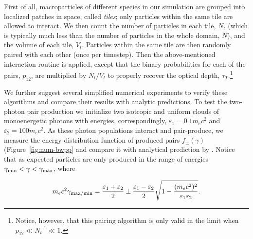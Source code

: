 First of all, macroparticles of different species in our simulation are grouped into localized patches in space, called \emph{tiles}; only particles within the same tile are allowed to interact. We then count the number of particles in each tile, $N_t$ (which is typically much less than the number of particles in the whole domain, $N$), and the volume of each tile, $V_t$. Particles within the same tile are then randomly paired with each other (once per timestep). Then the above-mentioned interaction routine is applied, except that the binary probabilities for each of the pairs, $p_{12}$, are multiplied by $N_t / V_t$ to properly recover the optical depth, $\tau_T$.\footnote{Notice, however, that this pairing algorithm is only valid in the limit when $p_{12}\ll N_t^{-1}\ll 1$.}

We further suggest several simplified numerical experiments to verify these algorithms and compare their results with analytic predictions. To test the two-photon pair production we initialize two isotropic and uniform clouds of monoenergetic photons with energies, correspondingly, $\varepsilon_1 = 0.1m_e c^2$ and $\varepsilon_2 = 100 m_e c^2$. As these photon populations interact and pair-produce, we measure the energy distribution function of produced pairs $f_{\pm}(\gamma)$ (Figure~\ref{fig:num-bwpp} and compare it with analytical prediction by \cite{1983Ap.....19..187A}. Notice that as expected particles are only produced in the range of energies $\gamma_{\rm min}<\gamma<\gamma_{\rm max}$, where

\begin{equation}
    m_e c^2 \gamma_{\rm max/min} = \frac{\varepsilon_1 + \varepsilon_2}{2} \pm \frac{\varepsilon_1 - \varepsilon_2}{2}\sqrt{1 - \frac{(m_ec^2)^2}{\varepsilon_1\varepsilon_2}}.
\end{equation}


